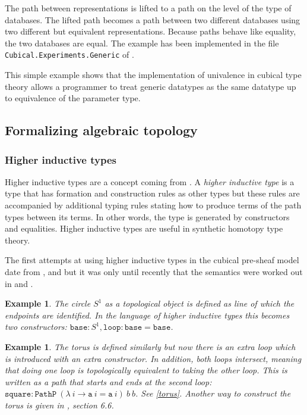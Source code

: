 \documentclass[12pt,a4paper,twoside,xetex]{book} %
\newcommand{\keyword}[1]{\emph{#1}\index{#1}}
\newtheorem{example}[theorem]{Example}
\newcommand{\op}[1]{\mathtt{#1}}
\begin{document}
The path between representations is lifted to a path on the level of the type 
of databases. The lifted path becomes a path between two different databases 
using two different but equivalent representations. Because paths behave like 
equality, the two databases are equal. The example has been implemented in the 
file \texttt{Cubical.Experiments.Generic} of \cite{Moertberg2018}.

This simple example shows that the implementation of univalence in cubical type 
theory allows a programmer to treat generic datatypes as the same datatype up 
to equivalence of the parameter type.

\subsection{Formalizing algebraic topology}

\subsubsection{Higher inductive types}\label{hit}

Higher inductive types are a concept coming from \cite{Voevodsky2013}. A 
\keyword{higher inductive type} is a type that has formation and construction 
rules  as other types but these rules are accompanied by additional typing 
rules stating how to produce terms of the path types between its terms. In 
other words, the type is generated by constructors and equalities. Higher 
inductive types are useful in synthetic homotopy type theory.

The first attempts at using higher inductive types in the cubical pre-sheaf 
model date from \cite{Licata2015}, \cite{Huber2016} and \cite{Cohen2016} but it 
was only until recently that the semantics were worked out in \cite 
{Lumsdaine2017} and  \cite{Coquand2018}.



\begin{example}
The \keyword{circle} $S^1$ as a topological object is defined as line of which 
the endpoints are identified. In the language of higher inductive types this 
becomes two constructors: $\op{base} : S^1,  \op{loop} : \op{base} = \op{base}$.
\end{example}

\begin{example}
The \keyword{torus} is defined similarly but now there is an extra loop which is 
introduced with an extra constructor. In addition, both loops intersect, 
meaning that doing one loop is topologically equivalent to taking the other 
loop. This is written as a path that starts and ends at the second loop: 
$\op{square} : \op{PathP} \ (\lambda \ i \rightarrow \op{a} \ i = \op{a} \ i) \ 
b  \ b$. See \cref{torus}. Another way to construct the torus is given in 
\cite{Voevodsky2013}, section 6.6.
\end{example}
\end{document}
